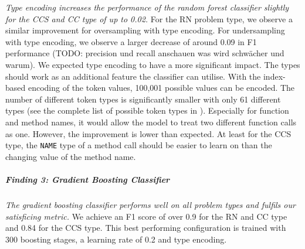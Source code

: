\textit{Type encoding increases the performance of the random forest classifier slightly for the CCS and CC type of up to 0.02.} For the RN problem type, we observe a similar improvement for oversampling with type encoding. For undersampling with type encoding, we observe a larger decrease of around 0.09 in F1 performance (TODO: precision und recall anschauen was wird schwächer und warum). 
We expected type encoding to have a more significant impact. The types should work as an additional feature the classifier can utilise. With the index-based encoding of the token values, 100,001 possible values can be encoded. The number of different token types is significantly smaller with only 61 different types (see the complete list of possible token types in ). Especially for function and method names, it would allow the model to treat two different function calls as one. 
However, the improvement is lower than expected. At least for the CCS type, the \texttt{NAME} type of a method call should be easier to learn on than the changing value of the method name.  

\begin{center}
\end{center}

\subparagraph{Finding 3: Gradient Boosting Classifier}\label{finding:rq2_gbc}
\textit{The gradient boosting classifier performs well on all problem types and fulfils our satisficing metric.} We achieve an F1 score of over 0.9 for the RN and CC type and 0.84 for the CCS type. This best performing configuration is trained with 300 boosting stages, a learning rate of 0.2 and type encoding.


